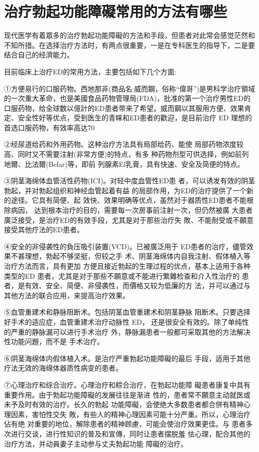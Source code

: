 \documentclass[12pt,UTF8]{ctexbook}
\begin{document}
\section{治疗勃起功能障礙常用的方法有哪些}

现代医学有着眾多的治疗勃起功能障礙的方法和手段，但患者对此常会感觉茫然和不知所措。在选择治疗方法时，有两点很重要，一是在专科医生的指导下，二是要结合自己的经濟能力。

目前临床上治疗ED的常用方法，主要包括如下几个方面:

①方便易行的口服药物。西地那非(商品名:威而鋼，俗称“偉哥”)是男科学治疗領域的一次重大革命，也是美國食品药物管理局(FDA)，批准的第一个治疗男性ED的口服药物，给全球数以億計的ED患者带来了希望。威而鋼以其服用方便、效果肯定、安全性好等优点，受到医生的青睐和ED患者的歡迎，是目前治疗 ED 理想的首选口服药物，有效率高达70%

②经尿道给药和外用药物。这种治疗方法具有局部给药、能使
局部药物浓度较高、同时又不需要注射(非常方便)的特点，有多
种药物剂型可供选择，例如前列地爾、比法爾(Befar)等，即前
列腺素El乳膏，具有快速、安全及简便的特点。

③阴茎海绵体血管活性药物(ICI)。对轻中度血管性ED患
者，可以诱发有效的阴茎勃起，并对勃起组织和神经血管起着有益
的局部作用，为ED的治疗提供了一个新的途径。它具有简便、起
效快、效果明确等优点，虽然对于器质性ED患者不能根除病因，
达到根本治疗的目的，需要每一次房事前注射一次，但仍然被廣
大患者廣泛接受，是治疗ED的有效手段，尤其是对于那些治疗失
敗、不能耐受或不願意接受其他疗法的ED患者。

④安全的非侵袭性的負压吸引装置(VCD)。已被廣泛用于
ED患者的治疗，儘管效果不甚理想，勃起不够坚挺，但较之手
术、阴茎海绵体内自我注射、假体植入等治疗方法而言，具有更加
方便且接近勃起的生理过程的优点，基本上适用于各种类型的ED
患者，尤其是对于那些不願意或不能进行繁雜检查和介入性治疗的
患者，是有效、安全、简便、非侵袭性，而價格又较为低廉的方
法，并可以通过与其他方法的联合应用，来提高治疗效果。

⑤血管重建术和静脉阻断术。包括阴茎血管重建术和阴茎静脉
阻断术。只要选择好手术的适应症，血管重建术治疗动脉性 ED，
还是很安全有效的。除了单纯性的严重的静脉漏可以进行手术治疗
外，静脉漏患者一般都可采取其他的方法解决性功能问題，而不是
手术治疗。

⑥阴茎海绵体内假体植入术。是治疗严重勃起功能障礙的最后
手段，适用于其他疗法无效的海绵体器质性病变的患者。

⑦心理治疗和综合治疗。心理治疗和粽合治疗，在勃起功能障
礙患者康复中具有重要作用。由于勃起功能障礙的发展往往是渐进
性的，患者常不願意主动就医或未予及时有效的治疗。长久的勃起
功能障礙，会使绝大多数患者都合併有精神心理因素，害怕性交失
敗，有些人的精神心理因素可能十分严重。所以，心理治疗佔有绝
对重要的地位，解除患者的精神顾慮，可能会使治疗效果更佳。与
患者多次进行交谈，进行性知识的普及和宣傳，同时让患者摆脱羞
怯心理，配合其他的治疗方法，并动員妻子主动参与丈夫勃起功能
障礙的治疗。
\end{document}
